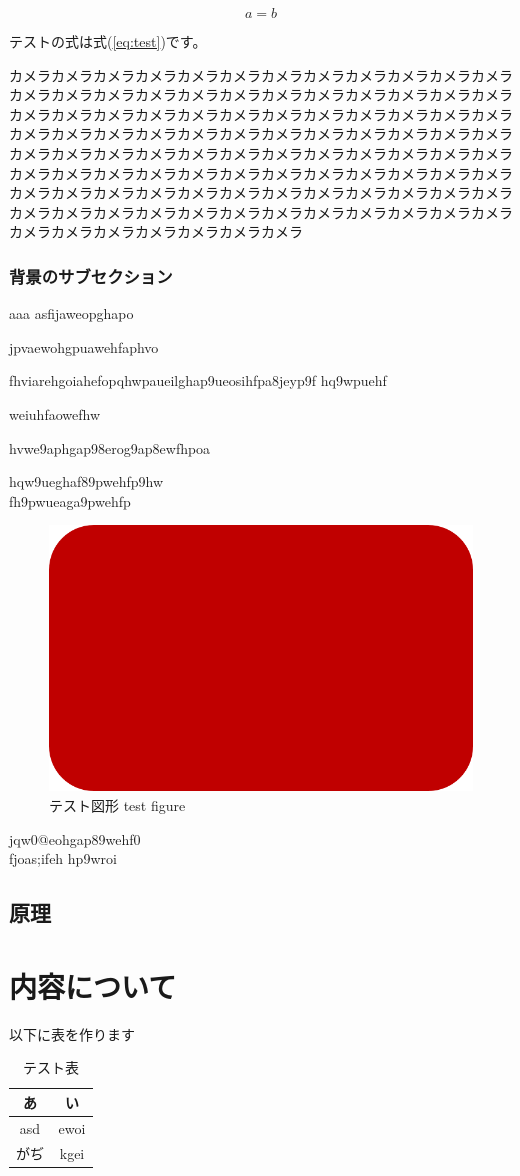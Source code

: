 \documentclass[11pt, a4paper]{jsarticle}
\numberwithin{equation}{section}
\newcommand{\newsection}[1]{\clearpage \vspace*{20zw} \section{#1} \clearpage}
\begin{document}
\begin{equation}
a = b \label{eq:test}
\end{equation}

テストの式は式(\ref{eq:test})です。

カメラカメラカメラカメラカメラカメラカメラカメラカメラカメラカメラカメラカメラカメラカメラカメラカメラカメラカメラカメラカメラカメラカメラカメラカメラカメラカメラカメラカメラカメラカメラカメラカメラカメラカメラカメラカメラカメラカメラカメラカメラカメラカメラカメラカメラカメラカメラカメラカメラカメラカメラカメラカメラカメラカメラカメラカメラカメラカメラカメラカメラカメラカメラカメラカメラカメラカメラカメラカメラカメラカメラカメラカメラカメラカメラカメラカメラカメラカメラカメラカメラカメラカメラカメラカメラカメラカメラカメラカメラカメラカメラカメラカメラカメラカメラカメラカメラカメラカメラカメラカメラカメラカメラ

\subsubsection{背景のサブセクション}
aaa
asfijaweopghapo



jpvaewohgpuawehfaphvo

fhviarehgoiahefopqhwpaueilghap9ueosihfpa8jeyp9f
hq9wpuehf

weiuhfaowefhw

hvwe9aphgap98erog9ap8ewfhpoa

hqw9ueghaf89pwehfp9hw\\
fh9pwueaga9pwehfp

\begin{figure}[H]
	\centering
	\includegraphics[width=0.6\linewidth]{test.png}
	\caption{テスト図形 test figure}
	\label{fig:test}
\end{figure}%


jqw0@eohgap89wehf0\\
fjoas;ifeh
hp9wroi
\subsection{原理}
\newsection{内容について}
以下に表を作ります
\begin{table}
	\centering
	\caption{テスト表}
	\label{tab:test}
	\begin{tabular}{|c|c|} \hline
		あ & い　\\ \hline
		asd & ewoi \\ \hline
		がぢ & kgei \\ \hline
	\end{tabular}
\end{table}
\end{document}
